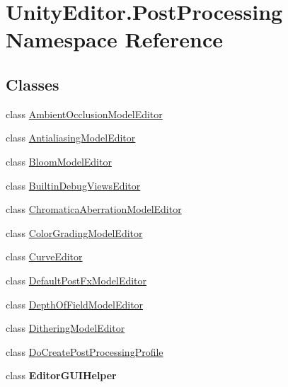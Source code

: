 \hypertarget{namespace_unity_editor_1_1_post_processing}{}\section{Unity\+Editor.\+Post\+Processing Namespace Reference}
\label{namespace_unity_editor_1_1_post_processing}
\subsection*{Classes}
\begin{DoxyCompactItemize}
\item 
class \mbox{\hyperlink{class_unity_editor_1_1_post_processing_1_1_ambient_occlusion_model_editor}{Ambient\+Occlusion\+Model\+Editor}}
\item 
class \mbox{\hyperlink{class_unity_editor_1_1_post_processing_1_1_antialiasing_model_editor}{Antialiasing\+Model\+Editor}}
\item 
class \mbox{\hyperlink{class_unity_editor_1_1_post_processing_1_1_bloom_model_editor}{Bloom\+Model\+Editor}}
\item 
class \mbox{\hyperlink{class_unity_editor_1_1_post_processing_1_1_builtin_debug_views_editor}{Builtin\+Debug\+Views\+Editor}}
\item 
class \mbox{\hyperlink{class_unity_editor_1_1_post_processing_1_1_chromatica_aberration_model_editor}{Chromatica\+Aberration\+Model\+Editor}}
\item 
class \mbox{\hyperlink{class_unity_editor_1_1_post_processing_1_1_color_grading_model_editor}{Color\+Grading\+Model\+Editor}}
\item 
class \mbox{\hyperlink{class_unity_editor_1_1_post_processing_1_1_curve_editor}{Curve\+Editor}}
\item 
class \mbox{\hyperlink{class_unity_editor_1_1_post_processing_1_1_default_post_fx_model_editor}{Default\+Post\+Fx\+Model\+Editor}}
\item 
class \mbox{\hyperlink{class_unity_editor_1_1_post_processing_1_1_depth_of_field_model_editor}{Depth\+Of\+Field\+Model\+Editor}}
\item 
class \mbox{\hyperlink{class_unity_editor_1_1_post_processing_1_1_dithering_model_editor}{Dithering\+Model\+Editor}}
\item 
class \mbox{\hyperlink{class_unity_editor_1_1_post_processing_1_1_do_create_post_processing_profile}{Do\+Create\+Post\+Processing\+Profile}}
\item 
class {\bfseries Editor\+G\+U\+I\+Helper}

\end{DoxyCompactItemize}
